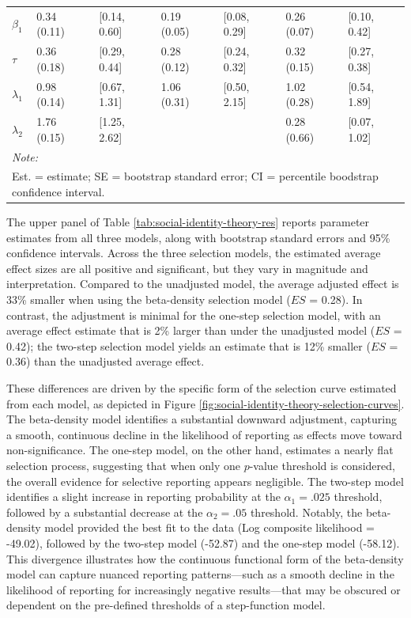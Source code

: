 \documentclass[
  american,
  man, donotrepeattitle,floatsintext]{apa7}
\begin{document}
\begin{table}
\begin{tabular}[t]{lllllll}
\hspace{1em}$\beta_1$ & 0.34 (0.11) & {}[0.14, 0.60] & 0.19 (0.05) & {}[0.08, 0.29] & 0.26 (0.07) & {}[0.10, 0.42]\\
\hspace{1em}$\tau$ & 0.36 (0.18) & {}[0.29, 0.44] & 0.28 (0.12) & {}[0.24, 0.32] & 0.32 (0.15) & {}[0.27, 0.38]\\
\hspace{1em}$\lambda_1$ & 0.98 (0.14) & {}[0.67, 1.31] & 1.06 (0.31) & {}[0.50, 2.15] & 1.02 (0.28) & {}[0.54, 1.89]\\
\hspace{1em}$\lambda_2$ & 1.76 (0.15) & {}[1.25, 2.62] &  &  & 0.28 (0.66) & {}[0.07, 1.02]\\
\bottomrule
\multicolumn{7}{l}{\rule{0pt}{1em}\textit{Note: }}\\
\multicolumn{7}{l}{\rule{0pt}{1em}Est. = estimate; SE = bootstrap standard error; CI = percentile boodstrap confidence interval.}\\
\end{tabular}
\end{table}

The upper panel of Table \ref{tab:social-identity-theory-res} reports parameter estimates from all three models, along with bootstrap standard errors and 95\% confidence intervals.
Across the three selection models, the estimated average effect sizes are all positive and significant, but they vary in magnitude and interpretation.
Compared to the unadjusted model, the average adjusted effect is 33\% smaller when using the beta-density selection model (\(ES\) = 0.28).
In contrast, the adjustment is minimal for the one-step selection model, with an average effect estimate that is 2\% larger than under the unadjusted model (\(ES\) = 0.42); the two-step selection model yields an estimate that is 12\% smaller (\(ES\) = 0.36) than the unadjusted average effect.

These differences are driven by the specific form of the selection curve estimated from each model, as depicted in Figure \ref{fig:social-identity-theory-selection-curves}.
The beta-density model identifies a substantial downward adjustment, capturing a smooth, continuous decline in the likelihood of reporting as effects move toward non-significance.
The one-step model, on the other hand, estimates a nearly flat selection process, suggesting that when only one \(p\)-value threshold is considered, the overall evidence for selective reporting appears negligible.
The two-step model identifies a slight increase in reporting probability at the \(\alpha_1 = .025\) threshold, followed by a substantial decrease at the \(\alpha_2 = .05\) threshold.
Notably, the beta-density model provided the best fit to the data (Log composite likelihood = -49.02), followed by the two-step model (-52.87) and the one-step model (-58.12).
This divergence illustrates how the continuous functional form of the beta-density model can capture nuanced reporting patterns---such as a smooth decline in the likelihood of reporting for increasingly negative results---that may be obscured or dependent on the pre-defined thresholds of a step-function model.
\end{document}
